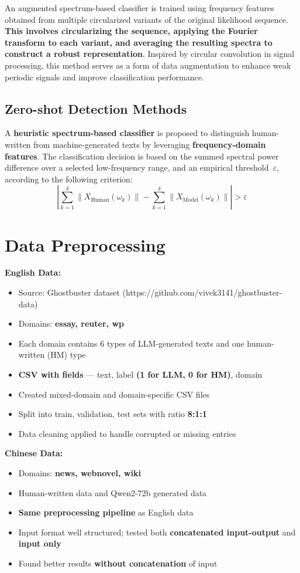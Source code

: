 \documentclass[lettersize,journal]{IEEEtran}
\begin{document}
An augmented spectrum-based classifier is trained using frequency features obtained from multiple circularized variants of the original likelihood sequence. \textbf{This involves circularizing the sequence, applying the Fourier transform to each variant, and averaging the resulting spectra to construct a robust representation}. Inspired by circular convolution in signal processing, this method serves as a form of data augmentation to enhance weak periodic signals and improve classification performance.

\subsection{Zero-shot Detection Methods}

A \textbf{heuristic spectrum-based classifier} is proposed to distinguish human-written from machine-generated texts by leveraging \textbf{frequency-domain features}. The classification decision is based on the summed spectral power difference over a selected low-frequency range, and an empirical threshold~$\varepsilon$, according to the following criterion:
\[
\left| \sum_{k=1}^{\delta} \| X_{\text{Human}}(\omega_k) \| - \sum_{k=1}^{\delta} \| X_{\text{Model}}(\omega_k) \| \right| > \varepsilon
\]


\section{Data Preprocessing}

\textbf{English Data:}
\begin{itemize}
  \item Source:  {\footnotesize Ghostbuster dataset (https://github.com/vivek3141/ghostbuster-data)}
  \item Domains: \textbf{essay, reuter, wp}
  \item Each domain contains 6 types of LLM-generated texts and one human-written (HM) type
  \item \textbf{CSV with fields} — text, label {\footnotesize \textbf{(1 for LLM, 0 for HM)}}, domain
  \item Created mixed-domain and domain-specific CSV files
  \item Split into train, validation, test sets with ratio \textbf{8:1:1}
  \item Data cleaning applied to handle corrupted or missing entries
\end{itemize}

\textbf{Chinese Data:}
\begin{itemize}
  \item Domains: \textbf{news, webnovel, wiki}
  \item Human-written data and Qwen2-72b generated data
  \item \textbf{Same preprocessing pipeline} as English data
  \item Input format well structured; tested both \textbf{concatenated input-output} and \textbf{input only}
  \item Found better results \textbf{without concatenation} of input 
\end{itemize}
\end{document}
